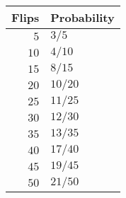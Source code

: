 \begin{tabular}{rl}   \toprule
Flips & Probability \\\midrule
$5$   & $3/5$       \\
$10$  & $4/10$      \\
$15$  & $8/15$      \\
$20$  & $10/20$     \\
$25$  & $11/25$     \\
$30$  & $12/30$     \\
$35$  & $13/35$     \\
$40$  & $17/40$     \\
$45$  & $19/45$     \\
$50$  & $21/50$     \\\bottomrule
\end{tabular}
